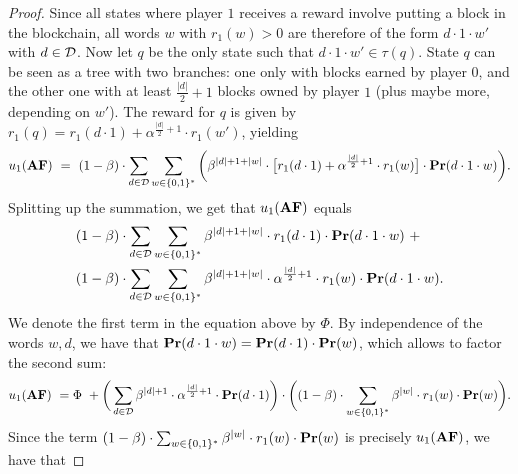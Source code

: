 \begin{proof}
Since all states where player $1$ receives a reward involve putting a block in the blockchain, all words 
$w$ with $r_1(w) > 0$ are therefore of the form $d\cdot 1\cdot w'$ with $d \in \mathcal{D}$. Now let $q$ be the only state such that $d\cdot 1\cdot w' \in \tau(q)$.
State $q$ can be seen as a tree with two branches: one only with blocks earned by player $0$, and the other one 
with at least ${\frac{|d|}{2}+1}$ blocks owned by player $1$ (plus maybe more, depending on $w'$). 
The reward for $q$ is given by $r_1(q) = r_1(d \cdot 1) + \alpha^{\frac{|d|}{2}+1}\cdot r_1(w')$, yielding
\begin{align*}
u_1(\text{\rm {\bf AF}}) \ = \ (1-\beta) \cdot \sum_{d\in \mathcal{D}} \sum_{w\in \{0,1\}^*} \bigg(\beta^{|d|+1+|w|}\cdot 
 \big[r_1(d\cdot 1) + \alpha^{\frac{|d|}{2}+1}\cdot r_1(w)\big] \cdot \mathbf{Pr}(d\cdot 1 \cdot w)\bigg).
\end{align*}
%
Splitting up the summation, we get that $ u_1(\text{\rm {\bf AF}})$ equals
\begin{align*}
&(1-\beta) \cdot \sum_{d\in \mathcal{D}} \sum_{w\in \{0,1\}^*}\beta^{|d|+1+|w|}\cdot r_1(d\cdot 1) \cdot \mathbf{Pr}(d\cdot 1\cdot w) \ +\\
 & (1-\beta) \cdot \sum_{d\in \mathcal{D}} \sum_{w\in \{0,1\}^*}\beta^{|d|+1+|w|}\cdot \alpha^{\frac{|d|}{2}+1}\cdot r_1(w) \cdot \mathbf{Pr}(d\cdot 1 \cdot w).
\end{align*}
%
We denote the first term in the equation above by $\Phi$. 
By independence of the words $w,d$, we have that $\mathbf{Pr}(d\cdot 1\cdot w) = \mathbf{Pr}(d\cdot 1)\cdot \mathbf{Pr}(w)$, which allows to factor the second sum:
%
\begin{align*}
 u_1(\text{\rm {\bf AF}}) \ = \Phi \ + \bigg(\sum_{d\in \mathcal{D}} \beta^{|d|+1}\cdot \alpha^{\frac{|d|}{2}+1}\cdot \mathbf{Pr}(d\cdot 1)\bigg) \cdot 
 \bigg((1-\beta) \cdot \sum_{w\in \{0,1\}^*} \beta^{|w|} \cdot r_1(w) \cdot \mathbf{Pr}(w)\bigg).
\end{align*}
%
Since the term $(1-\beta) \cdot \sum_{w\in \{0,1\}^*} \beta^{|w|} \cdot r_1(w) \cdot \mathbf{Pr}(w)$ is precisely $u_1(\text{\rm {\bf AF}})$, we have that

\end{proof}
